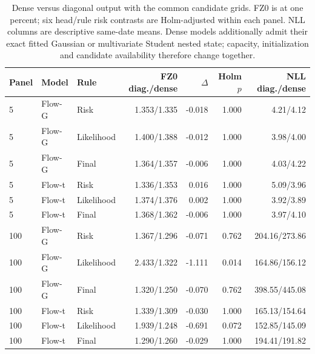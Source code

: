 \documentclass[11pt]{article}
\theoremstyle{definition}\newtheorem{definition}[theorem]{Definition}
\theoremstyle{remark}\newtheorem{remark}[theorem]{Remark}
\begin{document}
\begin{table}[htbp]
\centering\footnotesize
\setlength{\tabcolsep}{4pt}
\begin{tabular}{lllrrrr}
\toprule
Panel & Model & Rule & FZ0 diag./dense & $\Delta$ & Holm $p$ & NLL diag./dense \\
\midrule
5 & Flow-G & Risk & 1.353/1.335 & -0.018 & 1.000 & 4.21/4.12 \\
5 & Flow-G & Likelihood & 1.400/1.388 & -0.012 & 1.000 & 3.98/4.00 \\
5 & Flow-G & Final & 1.364/1.357 & -0.006 & 1.000 & 4.03/4.22 \\
5 & Flow-t & Risk & 1.336/1.353 & 0.016 & 1.000 & 5.09/3.96 \\
5 & Flow-t & Likelihood & 1.374/1.376 & 0.002 & 1.000 & 3.92/3.89 \\
5 & Flow-t & Final & 1.368/1.362 & -0.006 & 1.000 & 3.97/4.10 \\
100 & Flow-G & Risk & 1.367/1.296 & -0.071 & 0.762 & 204.16/273.86 \\
100 & Flow-G & Likelihood & 2.433/1.322 & -1.111 & 0.014 & 164.86/156.12 \\
100 & Flow-G & Final & 1.320/1.250 & -0.070 & 0.762 & 398.55/445.08 \\
100 & Flow-t & Risk & 1.339/1.309 & -0.030 & 1.000 & 165.13/154.64 \\
100 & Flow-t & Likelihood & 1.939/1.248 & -0.691 & 0.072 & 152.85/145.09 \\
100 & Flow-t & Final & 1.290/1.260 & -0.029 & 1.000 & 194.41/191.82 \\
\bottomrule
\end{tabular}
\caption{Dense versus diagonal output with the common candidate grids. FZ0 is at one percent; six head/rule risk contrasts are Holm-adjusted within each panel. NLL columns are descriptive same-date means. Dense models additionally admit their exact fitted Gaussian or multivariate Student nested state; capacity, initialization and candidate availability therefore change together.}\label{tab:r4-dense}
\end{table}
\end{document}
